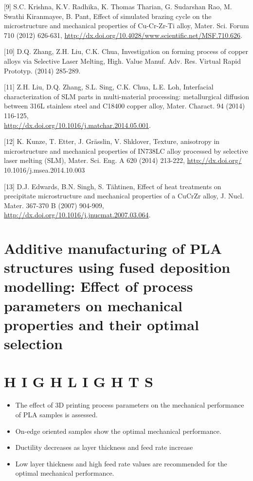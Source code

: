 \documentclass[10pt]{article}
\begin{document}
[9] S.C. Krishna, K.V. Radhika, K. Thomas Tharian, G. Sudarshan Rao, M. Swathi Kiranmayee, B. Pant, Effect of simulated brazing cycle on the microstructure and mechanical properties of Cu-Cr-Zr-Ti alloy, Mater. Sci. Forum 710 (2012) 626-631, \href{http://dx.doi.org/10.4028/www.scientific.net/MSF.710.626}{http://dx.doi.org/10.4028/www.scientific.net/MSF.710.626}.

[10] D.Q. Zhang, Z.H. Liu, C.K. Chua, Investigation on forming process of copper alloys via Selective Laser Melting, High. Value Manuf. Adv. Res. Virtual Rapid Prototyp. (2014) 285-289.

[11] Z.H. Liu, D.Q. Zhang, S.L. Sing, C.K. Chua, L.E. Loh, Interfacial characterization of SLM parts in multi-material processing: metallurgical diffusion between 316L stainless steel and C18400 copper alloy, Mater. Charact. 94 (2014) 116-125,\\
\href{http://dx.doi.org/10.1016/j.matchar.2014.05.001}{http://dx.doi.org/10.1016/j.matchar.2014.05.001}.

[12] K. Kunze, T. Etter, J. Grässlin, V. Shklover, Texture, anisotropy in microstructure and mechanical properties of IN738LC alloy processed by selective laser melting (SLM), Mater. Sci. Eng. A 620 (2014) 213-222, \href{http://dx.doi.org/}{http://dx.doi.org/} 10.1016/j.msea.2014.10.003

[13] D.J. Edwards, B.N. Singh, S. Tähtinen, Effect of heat treatments on precipitate microstructure and mechanical properties of a CuCrZr alloy, J. Nucl. Mater. 367-370 B (2007) 904-909, \href{http://dx.doi.org/10.1016/j.jnucmat.2007.03.064}{http://dx.doi.org/10.1016/j.jnucmat.2007.03.064}.

\section*{Additive manufacturing of PLA structures using fused deposition modelling: Effect of process parameters on mechanical properties and their optimal selection }


\section*{H I G H L I G H T S}
\begin{itemize}
  \item The effect of 3D printing process parameters on the mechanical performance of PLA samples is assessed.

  \item On-edge oriented samples show the optimal mechanical performance.

  \item Ductility decreases as layer thickness and feed rate increase

  \item Low layer thickness and high feed rate values are recommended for the optimal mechanical performance.

\end{itemize}
\end{document}
